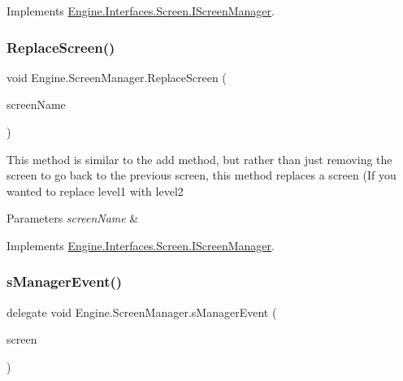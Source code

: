 Implements \hyperlink{a00470_a91b5204271edf5e137a85d3f8f3876d8}{Engine.\+Interfaces.\+Screen.\+I\+Screen\+Manager}.

\mbox{\label{a00538_a28af5b838f4345834dc2351e06c3d654}} 
\subsubsection{\texorpdfstring{Replace\+Screen()}{ReplaceScreen()}}
{\footnotesize\ttfamily void Engine.\+Screen\+Manager.\+Replace\+Screen (\begin{DoxyParamCaption}\item[{string}]{screen\+Name }\end{DoxyParamCaption})\hspace{0.3cm}{\ttfamily [inline]}}



This method is similar to the add method, but rather than just removing the screen to go back to the previous screen, this method replaces a screen (If you wanted to replace level1 with level2 


\begin{DoxyParams}{Parameters}
{\em screen\+Name} & \\
\hline
\end{DoxyParams}


Implements \hyperlink{a00470_aaa6bfa9a986729ada7dcea6ac40f078d}{Engine.\+Interfaces.\+Screen.\+I\+Screen\+Manager}.

\mbox{\label{a00538_ad442d9999cb6f335509f21ddb533bd76}} 
\subsubsection{\texorpdfstring{s\+Manager\+Event()}{sManagerEvent()}}
{\footnotesize\ttfamily delegate void Engine.\+Screen\+Manager.\+s\+Manager\+Event (\begin{DoxyParamCaption}\item[{\hyperlink{a00550}{Base\+Screen}}]{screen }\end{DoxyParamCaption})}

